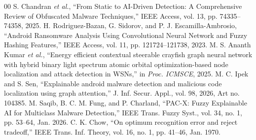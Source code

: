 \documentclass[conference]{IEEEtran}
\begin{document}
\begin{thebibliography}{00}
 S. Chandran \textit{et al.}, ``From Static to AI-Driven Detection: A Comprehensive Review of Obfuscated Malware Techniques,'' IEEE Access, vol. 13, pp. 74335--74358, 2025.
 H. Rodriguez-Bazan, G. Sidorov, and P. J. Escamilla-Ambrosio, ``Android Ransomware Analysis Using Convolutional Neural Network and Fuzzy Hashing Features,'' IEEE Access, vol. 11, pp. 121724--121738, 2023.
 M. S. Ananth Kumar \textit{et al.}, ``Energy efficient contextual steerable crayfish graph neural network with hybrid binary light spectrum atomic orbital optimization-based node localization and attack detection in WSNs,'' in \textit{Proc. ICMSCE}, 2025.
 M. C. Ipek and S. Sen, ``Explainable android malware detection and malicious code localization using graph attention,'' J. Inf. Secur. Appl., vol. 98, 2026, Art no. 104385.
 M. Saqib, B. C. M. Fung, and P. Charland, ``PAC-X: Fuzzy Explainable AI for Multiclass Malware Detection,'' IEEE Trans. Fuzzy Syst., vol. 34, no. 1, pp. 53--64, Jan. 2026.
 C. K. Chow, ``On optimum recognition error and reject tradeoff,'' IEEE Trans. Inf. Theory, vol. 16, no. 1, pp. 41--46, Jan. 1970.
\end{thebibliography}
\endgroup
\end{document}
